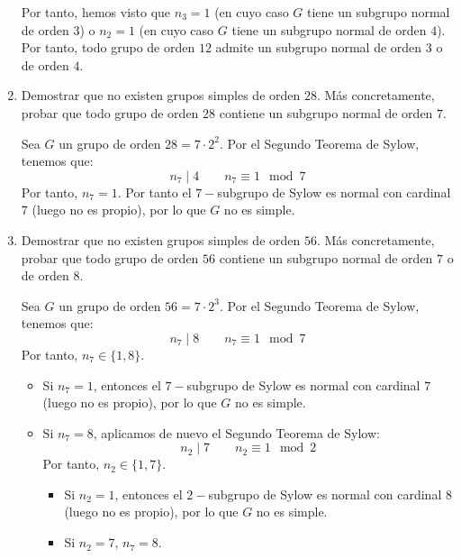 \begin{ejercicio}
\begin{enumerate}
        Por tanto, hemos visto que $n_3=1$ (en cuyo caso $G$ tiene un subgrupo normal de orden $3$) o $n_2=1$ (en cuyo caso $G$ tiene un subgrupo normal de orden $4$). Por tanto, todo grupo de orden $12$ admite un subgrupo normal de orden $3$ o de orden $4$.


        \item Demostrar que no existen grupos simples de orden $28$. Más concretamente, probar que todo grupo de orden $28$ contiene un subgrupo normal de orden $7$.
        
        Sea $G$ un grupo de orden $28=7\cdot 2^2$. Por el Segundo Teorema de Sylow, tenemos que:
        \begin{equation*}
            n_7 \mid 4 \qquad n_7 \equiv 1 \mod 7
        \end{equation*}
        Por tanto, $n_7=1$. Por tanto el $7-$subgrupo de Sylow es normal con cardinal $7$ (luego no es propio), por lo que $G$ no es simple.
        \item Demostrar que no existen grupos simples de orden $56$. Más concretamente, probar que todo grupo de orden $56$ contiene un subgrupo normal de orden $7$ o de orden $8$.
        
        Sea $G$ un grupo de orden $56=7\cdot 2^3$. Por el Segundo Teorema de Sylow, tenemos que:
        \begin{equation*}
            n_7 \mid 8 \qquad n_7 \equiv 1 \mod 7
        \end{equation*}
        Por tanto, $n_7\in \{1,8\}$.
        \begin{itemize}
            \item Si $n_7=1$, entonces el $7-$subgrupo de Sylow es normal con cardinal $7$ (luego no es propio), por lo que $G$ no es simple.
            \item Si $n_7=8$, aplicamos de nuevo el Segundo Teorema de Sylow:
            \begin{equation*}
                n_2 \mid 7 \qquad n_2 \equiv 1 \mod 2
            \end{equation*}
            Por tanto, $n_2\in \{1,7\}$.
            \begin{itemize}
                \item Si $n_2=1$, entonces el $2-$subgrupo de Sylow es normal con cardinal $8$ (luego no es propio), por lo que $G$ no es simple.
                \item Si $n_2=7$, $n_7=8$.
                

\end{itemize}
\end{itemize}
\end{enumerate}
\end{ejercicio}
